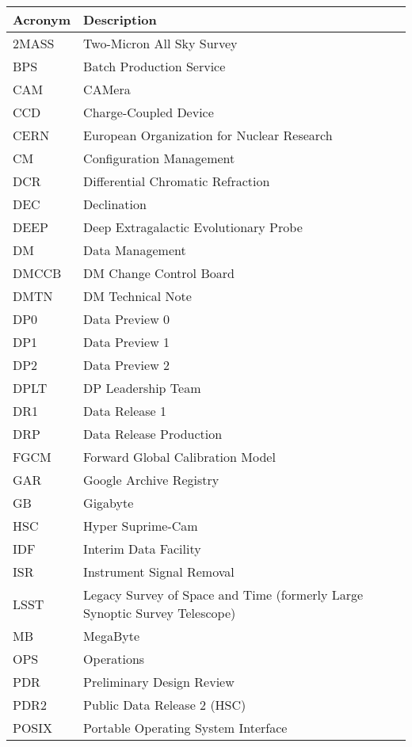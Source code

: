 \addtocounter{table}{-1}
\begin{longtable}{p{}p{}}\hline
\textbf{Acronym} & \textbf{Description}  \\\hline

2MASS & Two-Micron All Sky Survey \\\hline
BPS & Batch Production Service \\\hline
CAM & CAMera \\\hline
CCD & Charge-Coupled Device \\\hline
CERN & European Organization for Nuclear Research \\\hline
CM & Configuration Management \\\hline
DCR & Differential Chromatic Refraction \\\hline
DEC & Declination \\\hline
DEEP & Deep Extragalactic Evolutionary Probe \\\hline
DM & Data Management \\\hline
DMCCB & DM Change Control Board \\\hline
DMTN & DM Technical Note \\\hline
DP0 & Data Preview 0 \\\hline
DP1 & Data Preview 1 \\\hline
DP2 & Data Preview 2 \\\hline
DPLT & DP Leadership Team \\\hline
DR1 & Data Release 1 \\\hline
DRP & Data Release Production \\\hline
FGCM & Forward Global Calibration Model \\\hline
GAR & Google Archive Registry \\\hline
GB & Gigabyte \\\hline
HSC & Hyper Suprime-Cam \\\hline
IDF & Interim Data Facility \\\hline
ISR & Instrument Signal Removal \\\hline
LSST & Legacy Survey of Space and Time (formerly Large Synoptic Survey Telescope) \\\hline
MB & MegaByte \\\hline
OPS & Operations \\\hline
PDR & Preliminary Design Review \\\hline
PDR2 & Public Data Release 2 (HSC) \\\hline
POSIX & Portable Operating System Interface \\\hline

\end{longtable}
